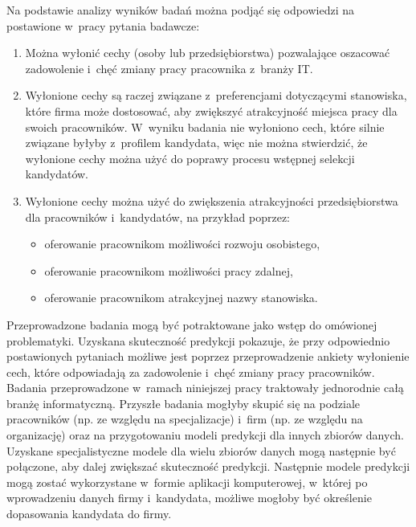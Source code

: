Na podstawie analizy wyników badań można podjąć się odpowiedzi na postawione w~pracy pytania badawcze:
\begin{enumerate}
    \item Można wyłonić cechy (osoby lub przedsiębiorstwa) pozwalające oszacować zadowolenie i~chęć zmiany pracy pracownika z~branży IT.
    \item Wyłonione cechy są raczej związane z~preferencjami dotyczącymi stanowiska, które firma może dostosować, aby zwiększyć atrakcyjność miejsca pracy dla swoich pracowników. W~wyniku badania nie wyłoniono cech, które silnie związane byłyby z~profilem kandydata, więc nie można stwierdzić, że wyłonione cechy można użyć do poprawy procesu wstępnej selekcji kandydatów.
    \item Wyłonione cechy można użyć do zwiększenia atrakcyjności przedsiębiorstwa dla pracowników i~kandydatów, na przykład poprzez:
    \begin{itemize}
        \item oferowanie pracownikom możliwości rozwoju osobistego,
        \item oferowanie pracownikom możliwości pracy zdalnej,
        \item oferowanie pracownikom atrakcyjnej nazwy stanowiska.
        \end{itemize}
\end{enumerate}

Przeprowadzone badania mogą być potraktowane jako wstęp do omówionej problematyki.
Uzyskana skuteczność predykcji pokazuje, że przy odpowiednio postawionych pytaniach możliwe jest poprzez przeprowadzenie ankiety wyłonienie cech, które odpowiadają za zadowolenie i~chęć zmiany pracy pracowników.
Badania przeprowadzone w~ramach niniejszej pracy traktowały jednorodnie całą branżę informatyczną.
Przyszłe badania mogłyby skupić się na podziale pracowników (np. ze względu na specjalizacje) i~firm (np. ze względu na organizację) oraz na przygotowaniu modeli predykcji dla innych zbiorów danych.
Uzyskane specjalistyczne modele dla wielu zbiorów danych mogą następnie być połączone, aby dalej zwiększać skuteczność predykcji.
Następnie modele predykcji mogą zostać wykorzystane w~formie aplikacji komputerowej, w~której po wprowadzeniu danych firmy i~kandydata, możliwe mogłoby być określenie dopasowania kandydata do firmy.


\thispagestyle{normal}
